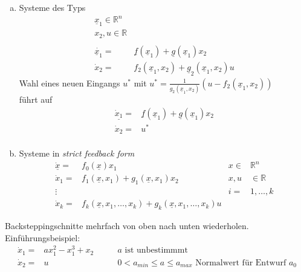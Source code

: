 \documentclass[11pt,a4paper]{article}
\begin{document}
\begin{enumerate}[a)]
\item Systeme des Typs
\begin{align*} 
\underline x_1 \in \mathbb{R}^n\\
x_2, u \in \mathbb{R}\\\\
\dot{\underline x_1} =&\underline f(\underline x_1) + \underline g(\underline x_1)x_2\\
\dot x_2 =& f_2(\underline x_1,x_2) + \underline g_2(\underline x_1,x_2)u
\end{align*} Wahl eines neuen Eingangs $u^*$ mit $u^* = \frac{1}{g_2(\underline x_1,x_2)} (u - f_2(\underline x_1, x_2))$\\
führt auf 
\begin{align*}
\underline{\dot x_1} = & \underline f(\underline x_1) + \underline g(\underline x_1)x_2\\
\dot x_2 = & u^*\\
\end{align*}
\item Systeme in \textit{ strict feedback form}
\begin{align*}
\underline{\dot x} = &f_0(\underline x) x_1 \qquad &x\in& \mathbb{R}^n\\
\dot x_1 =& f_1(\underline x,x_1) + g_1(\underline x,x_1)x_2 & x,u&\in \mathbb{R} \\
\vdots & &i =&1,\dots ,k \\
\dot x_k =& f_k(\underline x,x_1,\dots,x_k)+ g_k(\underline x,x_1,\dots,x_k)u
\end{align*}
\end{enumerate}
Backsteppingschnitte mehrfach von oben nach unten wiederholen.\\
Einführungsbeispiel: 
\begin{align*}
\dot x_1 = & a x_1^2 - x_1^3 + x_2 \qquad &a \text{ ist unbestimmmt}\\
\dot x_2 = & u & 0 < a_{min} \le a \le a_{max} \text{  Normalwert für Entwurf }a_0
\end{align*}
\end{document}
